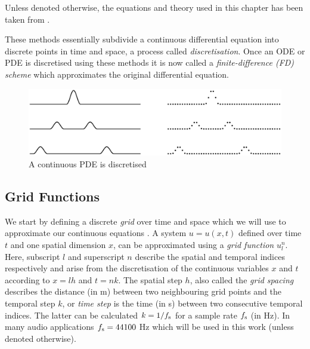 Unless denoted otherwise, the equations and theory used in this chapter has been taken from \cite{theBible}.


These methods essentially subdivide a continuous differential equation into discrete points in time and space, a process called \textit{discretisation}. Once an ODE or PDE is discretised using these methods it is now called a \textit{finite-difference (FD) scheme} which approximates the original differential equation. 

\begin{figure}[h]
    \centering
    \includegraphics[width=\textwidth]{figures/fdtd/gridFigure.eps}
    \caption{\label{fig:discretisation} A continuous PDE is discretised }
\end{figure}

\subsection{Grid Functions }
We start by defining a discrete \textit{grid} over time and space which we will use to approximate our continuous equations . A system $u = u(x,t)$ defined over time $t$ and one spatial dimension $x$, can be approximated using a \textit{grid function} $u_l^n$. Here, subscript $l$ and superscript $n$ describe the spatial and temporal indices respectively and arise from the discretisation of the continuous variables $x$ and $t$ according to $x=lh$ and $t=nk$. The spatial step $h$, also called the \textit{grid spacing} describes the distance (in m) between two neighbouring grid points and the temporal step $k$, or \textit{time step} is the time (in s) between two consecutive temporal indices. The latter can be calculated $k=1/f_\text{s}$ for a sample rate $f_\text{s}$ (in Hz). In many audio applications $f_\text{s} = 44100$ Hz which will be used in this work (unless denoted otherwise).

